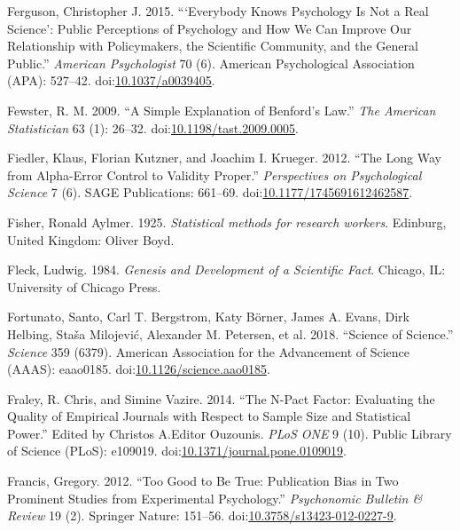 \documentclass[a5paper]{book}
\begin{document}
\hypertarget{ref-doi:10.1037ux2fa0039405}{}
Ferguson, Christopher J. 2015. ```Everybody Knows Psychology Is Not a
Real Science': Public Perceptions of Psychology and How We Can Improve
Our Relationship with Policymakers, the Scientific Community, and the
General Public.'' \emph{American Psychologist} 70 (6). American
Psychological Association (APA): 527--42.
doi:\href{https://doi.org/10.1037/a0039405}{10.1037/a0039405}.

\hypertarget{ref-doi:10.1198ux2ftast.2009.0005}{}
Fewster, R. M. 2009. ``A Simple Explanation of Benford's Law.''
\emph{The American Statistician} 63 (1): 26--32.
doi:\href{https://doi.org/10.1198/tast.2009.0005}{10.1198/tast.2009.0005}.

\hypertarget{ref-doi:10.1177ux2f1745691612462587}{}
Fiedler, Klaus, Florian Kutzner, and Joachim I. Krueger. 2012. ``The
Long Way from Alpha-Error Control to Validity Proper.''
\emph{Perspectives on Psychological Science} 7 (6). SAGE Publications:
661--69.
doi:\href{https://doi.org/10.1177/1745691612462587}{10.1177/1745691612462587}.

\hypertarget{ref-Fisher1925-jl}{}
Fisher, Ronald Aylmer. 1925. \emph{Statistical methods for research
workers}. Edinburg, United Kingdom: Oliver Boyd.

\hypertarget{ref-isbn:9780226253251}{}
Fleck, Ludwig. 1984. \emph{Genesis and Development of a Scientific
Fact}. Chicago, IL: University of Chicago Press.

\hypertarget{ref-doi:10.1126ux2fscience.aao0185}{}
Fortunato, Santo, Carl T. Bergstrom, Katy Börner, James A. Evans, Dirk
Helbing, Staša Milojević, Alexander M. Petersen, et al. 2018. ``Science
of Science.'' \emph{Science} 359 (6379). American Association for the
Advancement of Science (AAAS): eaao0185.
doi:\href{https://doi.org/10.1126/science.aao0185}{10.1126/science.aao0185}.

\hypertarget{ref-doi:10.1371ux2fjournal.pone.0109019}{}
Fraley, R. Chris, and Simine Vazire. 2014. ``The N-Pact Factor:
Evaluating the Quality of Empirical Journals with Respect to Sample Size
and Statistical Power.'' Edited by Christos A.Editor Ouzounis.
\emph{PLoS ONE} 9 (10). Public Library of Science (PLoS): e109019.
doi:\href{https://doi.org/10.1371/journal.pone.0109019}{10.1371/journal.pone.0109019}.

\hypertarget{ref-doi:10.3758ux2fs13423-012-0227-9}{}
Francis, Gregory. 2012. ``Too Good to Be True: Publication Bias in Two
Prominent Studies from Experimental Psychology.'' \emph{Psychonomic
Bulletin \& Review} 19 (2). Springer Nature: 151--56.
doi:\href{https://doi.org/10.3758/s13423-012-0227-9}{10.3758/s13423-012-0227-9}.
\end{document}
